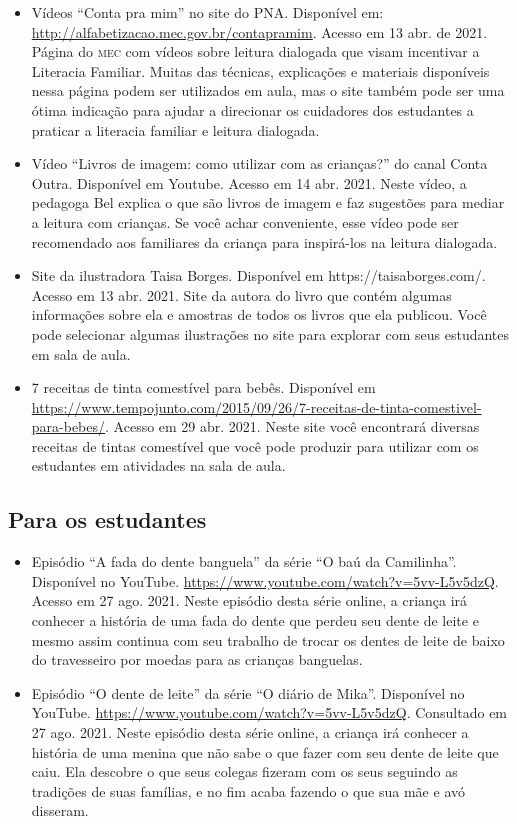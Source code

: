 \documentclass[11pt]{extarticle}
\begin{document}
\begin{itemize}
\item Vídeos “Conta pra mim” no site do PNA. Disponível em: \url{http://alfabetizacao.mec.gov.br/contapramim}. 
Acesso em 13 abr. de 2021.
Página do \textsc{mec} com vídeos sobre leitura dialogada que visam incentivar a Literacia Familiar. Muitas das 
técnicas, explicações e materiais disponíveis nessa página podem ser utilizados em aula, mas o site também 
pode ser uma ótima indicação para ajudar a direcionar os cuidadores dos estudantes a praticar 
a literacia familiar e leitura dialogada.

\item Vídeo “Livros de imagem: como utilizar com as crianças?” do canal Conta Outra. Disponível em Youtube. 
Acesso em 14 abr. 2021. 
Neste vídeo, a pedagoga Bel explica o que são livros de imagem e faz sugestões para mediar a leitura com 
crianças. Se você achar conveniente, esse vídeo pode ser recomendado aos familiares da criança 
para inspirá-los na leitura dialogada. 

\item Site da ilustradora Taisa Borges. Disponível em https://taisaborges.com/. Acesso em 13 abr. 2021. 
Site da autora do livro que contém algumas informações sobre ela e amostras de todos os livros que ela publicou. 
Você pode selecionar algumas ilustrações no site para explorar com seus estudantes em sala de aula. 

\item 7 receitas de tinta comestível para bebês. 
Disponível em \url{https://www.tempojunto.com/2015/09/26/7-receitas-de-tinta-comestivel-para-bebes/}. 
Acesso em 29 abr. 2021. 
Neste site você encontrará diversas receitas de tintas comestível que você pode produzir 
para utilizar com os estudantes em atividades na sala de aula. 
\end{itemize}

\subsection{Para os estudantes}
\begin{itemize}
\item Episódio ``A fada do dente banguela'' da série ``O baú da Camilinha''. Disponível no YouTube.
\url{https://www.youtube.com/watch?v=5vv-L5v5dzQ}. Acesso em 27 ago. 2021.
Neste episódio desta série online, a criança irá conhecer a história de uma fada do dente que perdeu seu dente de leite
e mesmo assim continua com seu trabalho de trocar os dentes de leite de baixo do travesseiro por moedas para
as crianças banguelas.

\item Episódio ``O dente de leite'' da série ``O diário de Mika''. Disponível no YouTube. \url{https://www.youtube.com/watch?v=5vv-L5v5dzQ}. Consultado em 27 ago. 2021.
Neste episódio desta série online, a criança irá conhecer a história de uma menina que não sabe o que 
fazer com seu dente de leite que caiu. Ela descobre o que seus colegas fizeram com os seus 
seguindo as tradições de suas famílias, e no fim acaba fazendo o que sua mãe e avó disseram.
\end{itemize}
\end{document}
